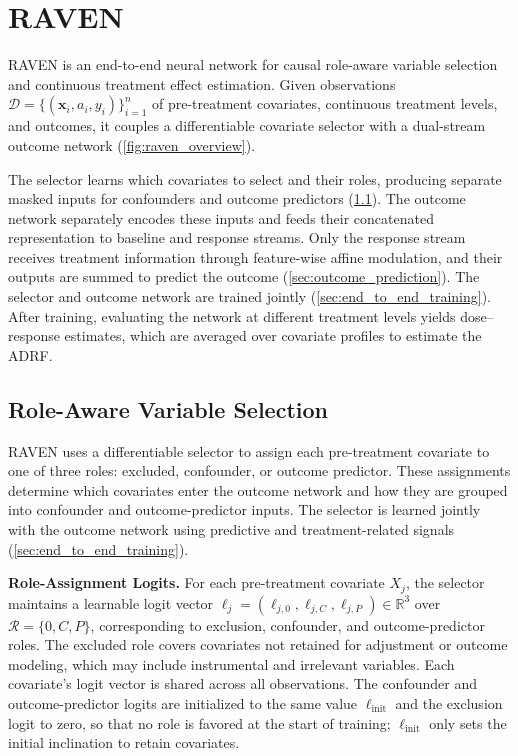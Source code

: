 \documentclass[twoside]{article}
\theoremstyle{plain}
\theoremstyle{definition}
\theoremstyle{remark}
\newtheorem{proof sketch}[theorem]{Proof Sketch}
\begin{document}
\vspace{-1em}
\section{RAVEN}
\label{sec:RAVEN}
\vspace{-1em}
RAVEN is an end-to-end neural network for causal role-aware variable selection and continuous treatment effect estimation.
Given observations $\mathcal{D}=\{(\mathbf{x}_i,a_i,y_i)\}_{i=1}^{n}$ of pre-treatment covariates, continuous treatment levels, and outcomes, it couples a differentiable covariate selector with a dual-stream outcome network (\cref{fig:raven_overview}).

The selector learns which covariates to select and their roles, producing separate masked inputs for confounders and outcome predictors (\cref{sec:role_aware_variable_selection}).
The outcome network separately encodes these inputs and feeds their concatenated representation to baseline and response streams.
Only the response stream receives treatment information through feature-wise affine modulation, and their outputs are summed to predict the outcome (\cref{sec:outcome_prediction}).
The selector and outcome network are trained jointly (\cref{sec:end_to_end_training}).
After training, evaluating the network at different treatment levels yields dose--response estimates, which are averaged over covariate profiles to estimate the ADRF.
\vspace{-0.5em}
\subsection{Role-Aware Variable Selection}
\label{sec:role_aware_variable_selection}
RAVEN uses a differentiable selector to assign each pre-treatment covariate to one of three roles: excluded, confounder, or outcome predictor.
These assignments determine which covariates enter the outcome network and how they are grouped into confounder and outcome-predictor inputs. 
The selector is learned jointly with the outcome network using predictive and treatment-related signals (\cref{sec:end_to_end_training}).

\textbf{Role-Assignment Logits.}
For each pre-treatment covariate $X_j$, the selector maintains a learnable logit vector $\boldsymbol{\ell}_j=(\ell_{j,0},\ell_{j,C},\ell_{j,P})\in\mathbb R^3$ over $\mathcal R=\{0,C,P\}$, corresponding to exclusion, confounder, and outcome-predictor roles.
The excluded role covers covariates not retained for adjustment or outcome modeling, which may include instrumental and irrelevant variables.
Each covariate's logit vector is shared across all observations. The confounder and outcome-predictor logits are initialized to the same value  $\ell_{\mathrm{init}}$ and the exclusion logit to zero, so that no role is favored at the start of training; $\ell_{\mathrm{init}}$ only sets the initial inclination to retain covariates.
\end{document}
